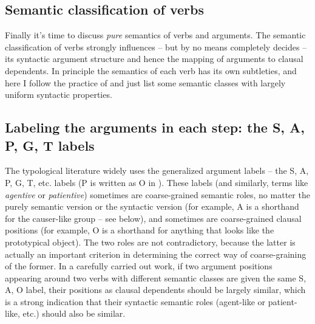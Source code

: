 \documentclass[UTF8, a4paper, oneside, scheme=plain]{ctexrep}
\newcommand*{\term}[1]{\emph{#1}}
\begin{document}
\subsection{Semantic classification of verbs}

Finally it's time to discuss \emph{pure} semantics of verbs and arguments.
The semantic classification of verbs strongly influences -- but by no means completely decides --
its syntactic argument structure 
and hence the mapping of arguments to clausal dependents.
In principle the semantics of each verb has its own subtleties,
and here I follow the practice of \citet{dixon2005semantic}
and just list some semantic classes with largely uniform syntactic properties.

\subsection{Labeling the arguments in each step: the S, A, P, G, T labels}\label{sec:valency.overview.sap}

The typological literature widely uses the generalized argument labels -- the S, A, P, G, T, etc. labels
(P is written as O in \citet{dixon2009basic1}).
These labels (and similarly, terms like \term{agentive} or \term{patientive}) 
sometimes are coarse-grained semantic roles, 
no matter the purely semantic version or the syntactic version
(for example, A is a shorthand for the causer-like group -- see below),
and sometimes are coarse-grained clausal positions
(for example, O is a shorthand for anything that looks like the prototypical object).
The two roles are not contradictory, 
because the latter is actually an important criterion 
in determining the correct way of coarse-graining of the former.
In a carefully carried out work,
if two argument positions appearing around two verbs with different semantic classes 
are given the same S, A, O label,
their positions as clausal dependents should be largely similar,
which is a strong indication that their syntactic semantic roles 
(agent-like or patient-like, etc.)
should also be similar. 
\end{document}
